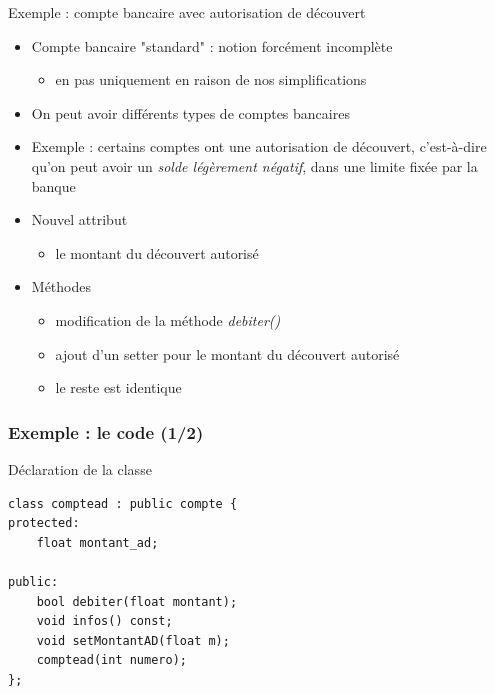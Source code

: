 \begin{frame}{Exemple : compte bancaire avec autorisation de découvert}
\begin{itemize}
\item Compte bancaire "standard" : notion forcément incomplète
\begin{itemize}
\item en pas uniquement en raison de nos simplifications
\end{itemize}
\item On peut avoir différents types de comptes bancaires
\item Exemple : certains comptes ont une autorisation de découvert, c'est-à-dire qu'on peut avoir un \textit{solde légèrement négatif}, dans une limite fixée par la banque
\item Nouvel attribut
\begin{itemize}
\item le montant du découvert autorisé
\end{itemize}
\item Méthodes
\begin{itemize}
\item modification de la méthode \textit{debiter()}
\item ajout d'un setter pour le montant du découvert autorisé
\item le reste est identique
\end{itemize}
\end{itemize}
\end{frame}

\begin{frame}[fragile]\frametitle{Exemple : le code (1/2)}
\begin{codeblock}{Déclaration de la classe}
\begin{lstlisting}
class comptead : public compte {
protected:
    float montant_ad;

public:
    bool debiter(float montant);
    void infos() const;
    void setMontantAD(float m);
    comptead(int numero);
};
\end{lstlisting}
\end{codeblock}
\end{frame}


